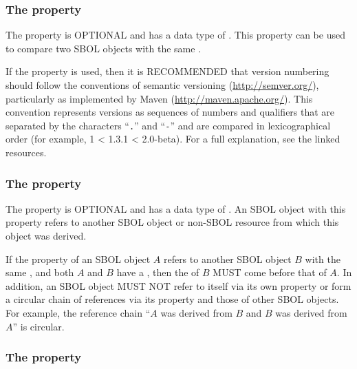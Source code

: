 \subsubsection*{The  property}
\label{sec:version}

The  property is OPTIONAL and has a data type of . This property can be used to compare two SBOL objects with the same .

If the  property is used, then it is RECOMMENDED that version numbering should follow the conventions of semantic versioning (\url{http://semver.org/}), particularly as implemented by Maven (\url{http://maven.apache.org/}).
This convention represents versions as sequences of numbers and qualifiers that are separated by the characters ``{\tt .}'' and ``{\tt -}'' and are compared in lexicographical order (for example, 1 < 1.3.1 < 2.0-beta).
For a full explanation, see the linked resources.

\subsubsection*{The  property}
\label{sec:wasDerivedFrom}

The  property is OPTIONAL and has a data type of . An SBOL object with this property refers to another SBOL object or non-SBOL resource from which this object was derived. 

If the  property of an SBOL object $A$ refers to another SBOL object $B$ with the same , and both $A$ and $B$ have a , then the  of $B$ MUST come before that of $A$. In addition, an SBOL object MUST NOT refer to itself via its own  property or form a circular chain of references via its  property and those of other SBOL objects. For example, the reference chain ``$A$ was derived from $B$ and $B$ was derived from $A$'' is circular.

\subsubsection*{The  property}
\label{sec:name}


